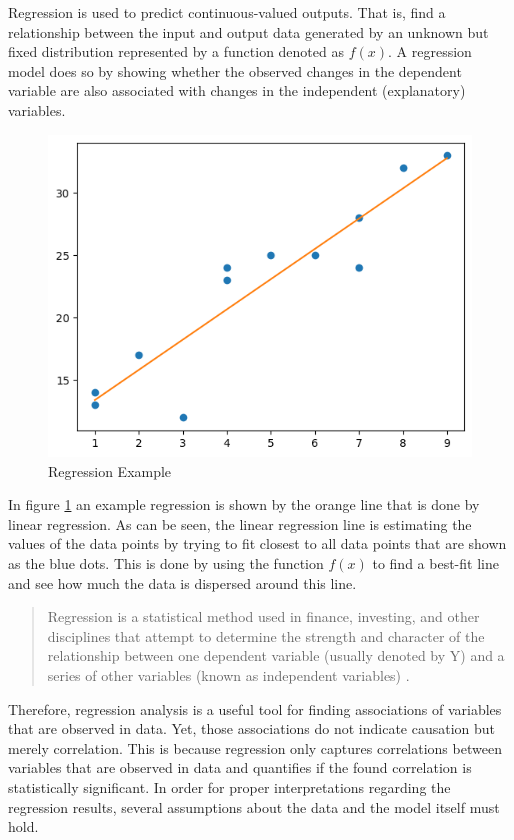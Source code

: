             Regression is used to predict continuous-valued outputs. That is, find a relationship between the input and output data generated by an unknown but fixed distribution represented by a function denoted as $f(x)$. 
            A regression model does so by showing whether the observed changes in the dependent variable are also associated with changes in the independent (explanatory) variables. 
            \begin{figure}[h!]
                \centering
                \includegraphics[scale=0.6]{figures/regression_plot.png}
                \caption{Regression Example}
                \label{fig:regression-example}
            \end{figure}
            In figure \ref{fig:regression-example} an example regression is shown by the orange line that is done by linear regression. As can be seen, the linear regression line is estimating the values of the data points by trying to fit closest to all data points that are shown as the blue dots.
            This is done by using the function $f(x)$ to find a best-fit line and see how much the data is dispersed around this line.
            \begin{quote}
                Regression is a statistical method used in finance, investing, and other disciplines that attempt to determine the strength and character of the relationship between one dependent variable (usually denoted by Y) and a series of other variables (known as independent variables) \cite{beersWhatRegressionDefinition}.
            \end{quote}
            Therefore, regression analysis is a useful tool for finding associations of variables that are observed in data. Yet, those associations do not indicate causation but merely correlation.
            This is because regression only captures correlations between variables that are observed in data and quantifies if the found correlation is statistically significant.
            In order for proper interpretations regarding the regression results, several assumptions about the data and the model itself must hold.

